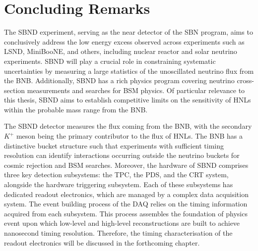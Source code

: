 \section{Concluding Remarks}

The SBND experiment, serving as the near detector of the SBN program, aims to conclusively address the low energy excess observed across experiments such as LSND, MiniBooNE, and others, including nuclear reactor and solar neutrino experiments. 
SBND will play a crucial role in constraining systematic uncertainties by measuring a large statistics of the unoscillated neutrino flux from the BNB.
Additionally, SBND has a rich physics program covering neutrino cross-section measurements and searches for BSM physics. 
Of particular relevance to this thesis, SBND aims to establish competitive limits on the sensitivity of HNLs within the probable mass range from the BNB.

The SBND detector measures the flux coming from the BNB, with the secondary $K^{+}$ meson being the primary contributor to the flux of HNLs.
The BNB has a distinctive bucket structure such that experiments with sufficient timing resolution can identify interactions occurring outside the neutrino buckets for cosmic rejection and BSM searches. 
Moreover, the hardware of SBND comprises three key detection subsystems: the TPC, the PDS, and the CRT system, alongside the hardware triggering subsystem. 
Each of these subsystems has dedicated readout electronics, which are managed by a complex data acquisition system.
The event building process of the DAQ relies on the timing information acquired from each subsystem. 
This process assembles the foundation of physics event upon which low-level and high-level reconstructions are built to achieve nanosecond timing resolution.
Therefore, the timing characterisation of the readout electronics will be discussed in the forthcoming chapter.
